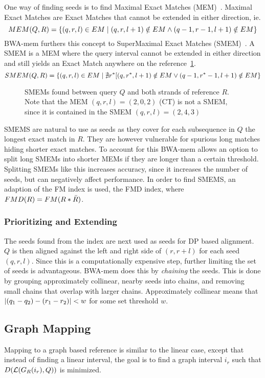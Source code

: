 One way of finding seeds is to find Maximal Exact Matches (MEM)~\cite{longmem, origmem}.
Maximal Exact Matches are Exact Matches that cannot be extended in either direction, ie. 
\[
  MEM(Q, R) = \left\{(q, r, l) \in EM \mid (q, r, l+1) \notin EM \wedge (q-1, r-1, l+1) \notin EM\right\}
\]
BWA-mem furthers this concept to SuperMaximal Exact Matches (SMEM)~\cite{origsmem}.
A SMEM is a MEM where the query interval cannot be extended in either direction and still yields an Exact Match anywhere on the reference~\ref{fig:smem}.
\[
  SMEM(Q, R) = \left\{(q, r, l) \in EM \mid \nexists r^*[(q, r^*, l+1) \notin EM \vee (q-1, r^*-1, l+1) \notin EM\right\}
\]
\begin{figure}
  \tikzpicture
  
  \endtikzpicture
  \caption{SMEMs found between query $Q$ and both strands of reference $R$. Note that the MEM $(q, r, l)=(2, 0, 2)$ (CT) is not a SMEM, since it is contained in the SMEM $(q, r, l) = (2, 4, 3)$}
  \label{fig:smem}
\end{figure}

SMEMS are natural to use as seeds as they cover for each subsequence in $Q$ the longest exact match in $R$.
They are however vulnerable for spurious long matches hiding shorter exact matches.
To account for this BWA-mem allows an option to split long SMEMs into shorter MEMs if they are longer than a certain threshold.
Splitting SMEMs like this increases accuracy, since it increases the number of seeds, but can negatively affect performance. 
In order to find SMEMS, an adaption of the FM index is used, the FMD index, where $FMD(R) = FM(R * \bar{R})$.

\subsubsection{Prioritizing and Extending}
The seeds found from the index are next used as seeds for DP based alignment.
$Q$ is then aligned against the left and right side of $(r, r+l)$ for each seed $(q, r, l)$.
Since this is a computationally expensive step, further limiting the set of seeds is advantageous.
BWA-mem does this by \emph{chaining} the seeds.
This is done by grouping approximately collinear, nearby seeds into chains, and removing small chains that overlap with larger chains.
Approximately collinear means that $\left | (q_1-q_2) -(r_1-r_2) \right |<w$ for some set threshold $w$.

\subsection{Graph Mapping}
\label{sec:graphmapping}
Mapping to a graph based reference is similar to the linear case, except that instead of finding a linear interval, the goal is to find a graph interval $i_r$ such that $D(\mathcal{L}(G_R(i_r), Q))$ is minimized. 

